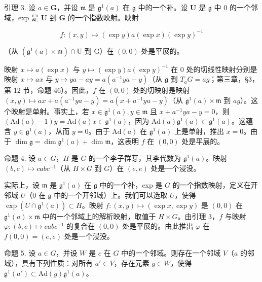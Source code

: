 引理 3. 设 \(a \in \mathbf{G}\)，并设 \(\mathfrak{m}\) 是 \(\mathfrak{g}^1(a)\) 在 \(\mathfrak{g}\) 中的一个补。设 \(\mathbf{U}\) 是 \(\mathfrak{g}\) 中 0 的一个邻域，exp 是 \(\mathbf{U}\) 到 \(\mathbf{G}\) 的一个指数映射。映射

\[
f: (x, y) \mapsto (\exp y) a (\exp x) (\exp y) ^ {- 1}
\]

（从 \((\mathfrak{g}^1 (a)\times \mathfrak{m})\cap \mathrm{U}\) 到 G）在 \((0,0)\) 处是平展的。

映射 \(x \mapsto a(\exp x)\) 与 \(y \mapsto (\exp y)a(\exp y)^{-1}\) 在 0 处的切线性映射分别是映射 \(x \mapsto ax\) 与 \(y \mapsto ya - ay = a(a^{-1}ya - y)\)（从 \(\mathfrak{g}\) 到 \(T_aG = ag\)；第三章，§3，第 12 节，命题 46）。因此，\(f\) 在 \((0,0)\) 处的切映射是映射 \((x,y) \mapsto ax + a(a^{-1}ya - y) = a(x + a^{-1}ya - y)\)（从 \(\mathfrak{g}^1(a) \times \mathfrak{m}\) 到 \(ag\)）。这个映射是单射。事实上，若 \(x \in \mathfrak{g}^1(a), y \in \mathfrak{m}\) 且 \(x + a^{-1}ya - y = 0\)，则 \((\mathrm{Ad}(a) - 1)y = \mathrm{Ad}(a)x \in \mathfrak{g}^1(a)\)，因为 \(\mathrm{Ad}(a)\mathfrak{g}^1(a) \subset \mathfrak{g}^1(a)\)。这蕴含 \(y \in \mathfrak{g}^1(a)\)，从而 \(y = 0\)。由于 \(\mathrm{Ad}(a)\) 在 \(\mathfrak{g}^1(a)\) 上是单射，推出 \(x = 0\)。由于 \(\dim \mathfrak{g} = \dim \mathfrak{g}^1(a) + \dim \mathfrak{m}\)，这表明 \(f\) 在 \((0,0)\) 处是平展的。

命题 4. 设 \(a \in G\)，\(H\) 是 \(G\) 的一个李子群芽，其李代数为 \(\mathfrak{g}^1(a)\)。映射 \((b, c) \mapsto cabc^{-1}\)（从 \(H \times G\) 到 \(G\)）在 \((e, e)\) 处是一个浸没。

实际上，设 \(\mathfrak{m}\) 是 \(\mathfrak{g}^1(a)\) 在 \(\mathfrak{g}\) 中的一个补，exp 是 \(G\) 的一个指数映射，定义在开邻域 \(U\)（\(0\) 在 \(\mathfrak{g}\) 中的一个开邻域）上。我们可以选取 \(U\)，使得 \(\exp(U \cap \mathfrak{g}^1(a)) \subset H\)。映射 \(f: (x, y) \mapsto (\exp x, \exp y)\) 是 \((0, 0)\) 在 \(\mathfrak{g}^1(a) \times \mathfrak{m}\) 中的一个邻域上的解析映射，取值于 \(H \times G\)。由引理 3，\(f\) 与映射 \(\varphi: (b, c) \mapsto cabc^{-1}\) 的复合在 \((0, 0)\) 处是平展的。由此推出 \(\varphi\) 在 \(f(0, 0) = (e, e)\) 处是一个浸没。

命题 5. 设 \(a \in G\)，并设 \(W\) 是 \(e\) 在 \(G\) 中的一个邻域。则存在一个邻域 \(V\)（\(a\) 的邻域），具有下列性质：对所有 \(a' \in V\)，存在元素 \(g \in W\)，使得 \(\mathfrak{g}^1(a') \subset \mathrm{Ad}(g)\mathfrak{g}^1(a)\)。


